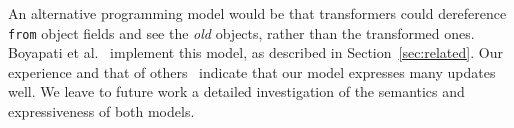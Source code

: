 An alternative programming model would be that transformers could dereference
\texttt{from} object fields and see the \emph{old} objects, rather than the
transformed ones.  Boyapati et al.~\cite{boyapati03lazy} implement this
model, as described in Section~\ref{sec:related}. Our experience and that of
others~\cite{k42usenix,neamtiu06dsu,neamtiu09stump,upstare} indicate
that our model expresses many updates well.  We leave to future work a
detailed investigation of the semantics and expressiveness of both
models.


